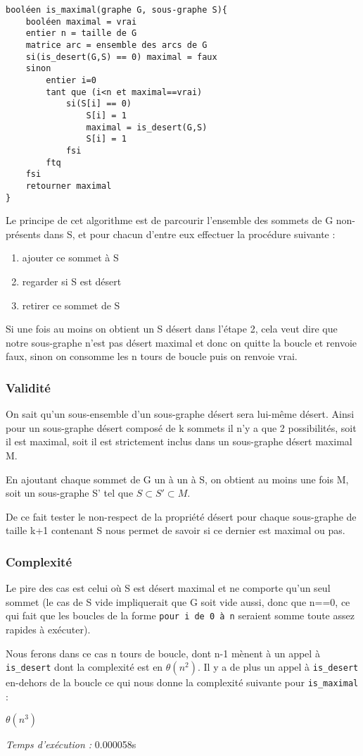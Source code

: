 \begin{verbatim}
booléen is_maximal(graphe G, sous-graphe S){
    booléen maximal = vrai
    entier n = taille de G
    matrice arc = ensemble des arcs de G
    si(is_desert(G,S) == 0) maximal = faux
    sinon
        entier i=0
        tant que (i<n et maximal==vrai)
            si(S[i] == 0)
                S[i] = 1
                maximal = is_desert(G,S)
                S[i] = 1
            fsi
        ftq
    fsi
    retourner maximal
}
\end{verbatim}
Le principe de cet algorithme est de parcourir l'ensemble des sommets de G non-présents dans S, et pour chacun d'entre eux effectuer la procédure suivante :
\begin{enumerate}
	\item ajouter ce sommet à S
	\item regarder si S est désert 
	\item retirer ce sommet de S
\end{enumerate}
Si une fois au moins on obtient un S désert dans l'étape 2, cela veut dire que notre sous-graphe n'est pas désert maximal et donc on quitte la boucle et renvoie faux, sinon on consomme les n tours de boucle puis on renvoie vrai. 

\subsubsection{Validité}

On sait qu'un sous-ensemble d'un sous-graphe désert sera lui-même désert. Ainsi pour un sous-graphe désert composé de k sommets il n'y a que 2 possibilités, soit il est maximal, soit il est strictement inclus dans un sous-graphe désert maximal M. 

En ajoutant chaque sommet de G un à un à S, on obtient au moins une fois M, soit un sous-graphe S' tel que $S \subset S' \subset M$.

De ce fait tester le non-respect de la propriété \og désert \fg{} pour chaque sous-graphe de taille k+1 contenant S nous permet de savoir si ce dernier est maximal ou pas.

\subsubsection{Complexité}

Le pire des cas est celui où S est désert maximal et ne comporte qu'un seul sommet (le cas de S vide impliquerait que G soit vide aussi, donc que n==0, ce qui fait que les boucles de la forme \verb|pour i de 0 à n| seraient somme toute assez rapides à exécuter). 

Nous ferons dans ce cas n tours de boucle, dont n-1 mènent à un appel à \verb|is_desert| dont la complexité est en $\theta(n^2)$. Il y a de  plus un appel à \verb|is_desert| en-dehors de la boucle ce qui nous donne la complexité suivante pour \verb|is_maximal| : 

$\theta(n^3)$

\emph{Temps d'exécution :} 0.000058s

